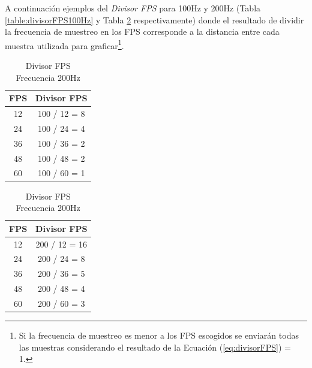 \documentclass[12pt,a4paper]{article}
\begin{document}
A continuación ejemplos del \textit{Divisor FPS} para 100Hz y 200Hz (Tabla \ref{table:divisorFPS100Hz} y Tabla \ref{table:divisorFPS200Hz} respectivamente) donde el resultado de dividir la frecuencia de muestreo en los FPS corresponde a la distancia entre cada muestra utilizada para graficar\footnote{Si la frecuencia de muestreo es menor a los FPS escogidos se enviarán todas las muestras considerando el resultado de la Ecuación (\ref{eq:divisorFPS}) = 1.}.

\begin{table}[!htb]
	\begin{minipage}{.5\linewidth}
		\centering
			\begin{tabular}{|c|c|}
				\hline
				\textbf{FPS} & \multicolumn{1}{l|}{\textbf{Divisor FPS}} \\ \hline
				12           & 100 / 12 = 8                                         \\ \hline
				24           & 100 / 24 = 4                                         \\ \hline
				36           & 100 / 36 = 2                                         \\ \hline
				48           & 100 / 48 = 2                                         \\ \hline
				60           & 100 / 60 = 1                                         \\ \hline
			\end{tabular}
			\caption{Divisor FPS Frecuencia 100Hz}
			\label{table:divisorFPS100Hz}
	\end{minipage}%
	\begin{minipage}{.5\linewidth}
		\centering
		\begin{tabular}{|c|c|}
			\hline
			\textbf{FPS} & \multicolumn{1}{l|}{\textbf{Divisor FPS}} \\ \hline
				12           & 200 / 12 = 16                             \\ \hline
				24           & 200 / 24 = 8                              \\ \hline
				36           & 200 / 36 = 5                              \\ \hline
				48           & 200 / 48 = 4                              \\ \hline
				60           & 200 / 60 = 3                              \\ \hline
		\end{tabular}
		\caption{Divisor FPS Frecuencia 200Hz}
		\label{table:divisorFPS200Hz}
	\end{minipage}
\end{table}
\end{document}
